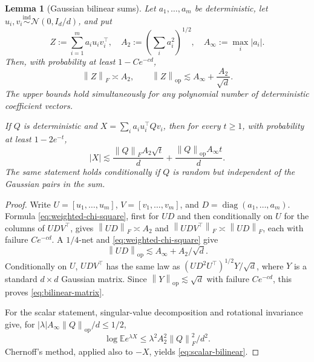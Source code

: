 \documentclass[11pt]{article}
\newtheorem{lemma}[lemma]{Lemma}
\theoremstyle{definition}
\newcommand{\Ee}{\mathbb E}
\newcommand{\cN}{\mathcal N}
\newcommand{\Id}{I}
\newcommand{\normF}[1]{\left\lVert #1\right\rVert_F}
\newcommand{\normop}[1]{\left\lVert #1\right\rVert_{\mathrm{op}}}
\begin{document}
\begin{lemma}[Gaussian bilinear sums]
\label{lem:bilinear}
Let $a_1,\ldots,a_m$ be deterministic, let
$u_i,v_i\overset{\mathrm{ind}}\sim\cN(0,\Id_d/d)$, and put
\[
 Z:=\sum_{i=1}^m a_i u_i v_i^\top,
 \quad A_2:=\left(\sum_i a_i^2\right)^{1/2},
 \quad A_\infty:=\max_i|a_i|.
\]
Then, with probability at least $1-Ce^{-cd}$,
\begin{equation}
 \normF{Z}\asymp A_2,
 \qquad
 \normop{Z}\lesssim A_\infty+\frac{A_2}{\sqrt d}.
 \label{eq:bilinear-matrix}
\end{equation}
The upper bounds hold simultaneously for any polynomial number of
deterministic coefficient vectors.

If $Q$ is deterministic and
$X=\sum_i a_i u_i^\top Qv_i$, then for every $t\geq1$, with
probability at least $1-2e^{-t}$,
\begin{equation}
 |X|\lesssim
 \frac{\normF{Q}A_2\sqrt t}{d}
 +\frac{\normop{Q}A_\infty t}{d}.
 \label{eq:scalar-bilinear}
\end{equation}
The same statement holds conditionally if $Q$ is random but independent
of the Gaussian pairs in the sum.
\end{lemma}

\begin{proof}
Write $U=[u_1,\ldots,u_m]$, $V=[v_1,\ldots,v_m]$, and
$D=\operatorname{diag}(a_1,\ldots,a_m)$.  Formula
\eqref{eq:weighted-chi-square}, first for $UD$ and then conditionally on
$U$ for the columns of $UDV^\top$, gives
$\normF{UD}\asymp A_2$ and
$\normF{UDV^\top}\asymp\normF{UD}$, each with failure $Ce^{-cd}$.
A $1/4$-net and \eqref{eq:weighted-chi-square} give
\[
 \normop{UD}\lesssim A_\infty+A_2/\sqrt d.
\]
Conditionally on $U$,
$UDV^\top$ has the same law as
$(UD^2U^\top)^{1/2}Y/\sqrt d$, where $Y$ is a standard $d\times d$
Gaussian matrix.  Since $\normop{Y}\lesssim\sqrt d$ with failure
$Ce^{-cd}$, this proves \eqref{eq:bilinear-matrix}.

For the scalar statement, singular-value decomposition and rotational
invariance give, for
$|\lambda|A_\infty\normop{Q}/d\leq1/2$,
\[
 \log\Ee e^{\lambda X}
 \leq \lambda^2 A_2^2\normF{Q}^2/d^2.
\]
Chernoff's method, applied also to $-X$, yields
\eqref{eq:scalar-bilinear}.
\end{proof}
\end{document}
